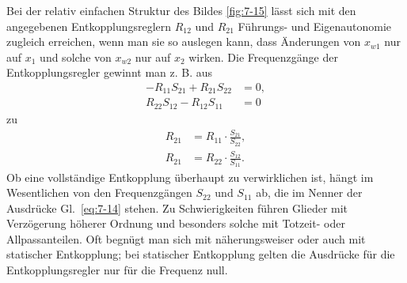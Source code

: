 Bei der relativ einfachen Struktur des Bildes \ref{fig:7-15} lässt sich mit den angegebenen Entkopplungsreglern \(R_{12}\) und \(R_{21}\) Führungs- und Eigenautonomie zugleich erreichen, wenn man sie so auslegen kann, dass Änderungen von \(x_{w1}\) nur auf \(x_1\) und solche von \(x_{w2}\) nur auf \(x_2\) wirken.
Die Frequenzgänge der Entkopplungsregler gewinnt man z. B. aus
\begin{equation}
    \begin{split}
        -R_{11}S_{21} + R_{21}S_{22} &= 0,\\
        R_{22}S_{12} - R_{12}S_{11} &= 0
    \end{split}
\end{equation}
zu
\begin{equation}\label{eq:7-14}
    \begin{split}
        R_{21} &= R_{11} \cdot \frac{S_{21}}{S_{22}},\\
        R_{21} &= R_{22} \cdot \frac{S_{12}}{S_{11}}.
    \end{split}
\end{equation}
Ob eine vollständige Entkopplung überhaupt zu verwirklichen ist, hängt im Wesentlichen von den Frequenzgängen \(S_{22}\) und \(S_{11}\) ab, die im Nenner der Ausdrücke Gl.~\eqref{eq:7-14} stehen.
Zu Schwierigkeiten führen Glieder mit Verzögerung höherer Ordnung und besonders solche mit Totzeit- oder Allpassanteilen.
Oft begnügt man sich mit näherungsweiser oder auch mit statischer Entkopplung; bei statischer Entkopplung gelten die Ausdrücke für die Entkopplungsregler nur für die Frequenz null.
